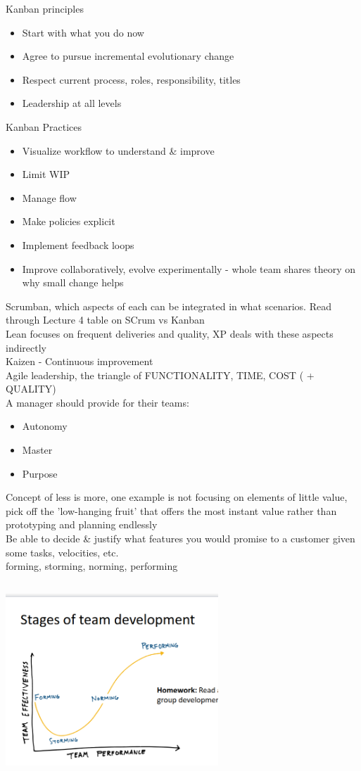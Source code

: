 \documentclass[10pt]{article}
\begin{document}
Kanban principles
\begin{itemize}
\item Start with what you do now
\item Agree to pursue incremental evolutionary change
\item Respect current process, roles, responsibility, titles
\item Leadership at all levels
\end{itemize}
Kanban Practices
\begin{itemize}
\item Visualize workflow to understand \& improve
\item Limit WIP
\item Manage flow
\item Make policies explicit
\item Implement feedback loops
\item Improve collaboratively, evolve experimentally - whole team shares theory on why small change helps
\end{itemize}
Scrumban, which aspects of each can be integrated in what scenarios. Read through Lecture 4 table on SCrum vs Kanban\\
Lean focuses on frequent deliveries and quality, XP deals with these aspects indirectly\\
Kaizen - Continuous improvement\\
Agile leadership, the triangle of FUNCTIONALITY, TIME, COST ( + QUALITY)\\
A manager should provide for their teams:
\begin{itemize}
\item Autonomy
\item Master
\item Purpose
\end{itemize}
Concept of less is more, one example is not focusing on elements of little value, pick off the 'low-hanging fruit' that offers the most instant value rather than prototyping and planning endlessly\\
Be able to decide \& justify what features you would promise to a customer given some tasks, velocities, etc.\\
forming, storming, norming, performing\\
\includegraphics[width=8cm, height=8cm]{development}\\
\end{document}
